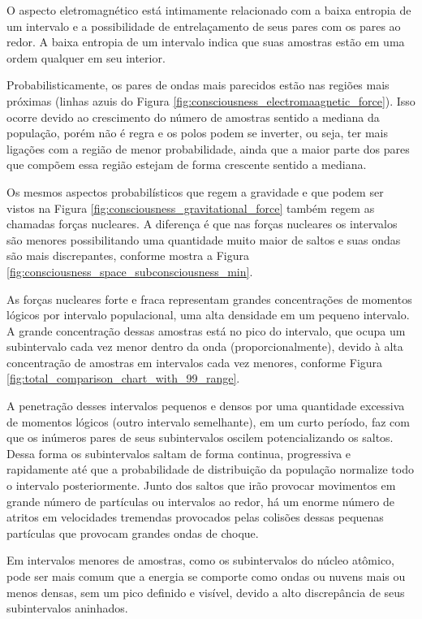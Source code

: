 O aspecto eletromagnético está intimamente relacionado com a baixa entropia de um intervalo e a possibilidade de entrelaçamento de seus pares com os pares ao redor. A baixa entropia de um intervalo indica que suas amostras estão em uma ordem qualquer em seu interior.

Probabilisticamente, os pares de ondas mais parecidos estão nas regiões mais próximas (linhas azuis do Figura \ref{fig:consciousness_electromaagnetic_force}). Isso ocorre devido ao crescimento do número de amostras sentido a mediana da população, porém não é regra e os polos podem se inverter, ou seja, ter mais ligações com a região de menor probabilidade, ainda que a maior parte dos pares que compõem essa região estejam de forma crescente sentido a mediana.

Os mesmos aspectos probabilísticos que regem a gravidade e que podem ser vistos na Figura \ref{fig:consciousness_gravitational_force} também regem as chamadas forças nucleares. A diferença é que nas forças nucleares os intervalos são menores possibilitando uma quantidade muito maior de saltos e suas ondas são mais discrepantes, conforme mostra a Figura \ref{fig:consciousness_space_subconsciousness_min}.

As forças nucleares forte e fraca representam grandes concentrações de momentos lógicos por intervalo populacional, uma alta densidade em um pequeno intervalo. A grande concentração dessas amostras está no pico do intervalo, que ocupa um subintervalo cada vez menor dentro da onda (proporcionalmente), devido à alta concentração de amostras em intervalos cada vez menores, conforme Figura \ref{fig:total_comparison_chart_with_99_range}.

A penetração desses intervalos pequenos e densos por uma quantidade excessiva de momentos lógicos (outro intervalo semelhante), em um curto período, faz com que os inúmeros pares de seus subintervalos oscilem potencializando os saltos. Dessa forma os subintervalos saltam de forma continua, progressiva e rapidamente até que a probabilidade de distribuição da população normalize todo o intervalo posteriormente. Junto dos saltos que irão provocar movimentos em grande número de partículas ou intervalos ao redor, há um enorme número de atritos em velocidades tremendas provocados pelas colisões dessas pequenas partículas que provocam grandes ondas de choque. 

Em intervalos menores de amostras, como os subintervalos do núcleo atômico, pode ser mais comum que a energia se comporte como ondas ou nuvens mais ou menos densas, sem um pico definido e visível, devido a alto discrepância de seus subintervalos aninhados.

